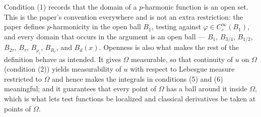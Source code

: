 \begin{definition}
Condition (1) records that the domain of a $p$-harmonic function is an open set.  This is the
paper's convention everywhere and is not an extra restriction: the paper defines
$p$-harmonicity in the open ball $B_1$, testing against $\varphi\in C^\infty_c(B_1)$, and every
domain that occurs in the argument is an open ball --- $B_1$, $B_{3/4}$, $B_{1/2}$, $B_{2\tau}$,
$B_\tau$, $B_{\rho_i}$, $B_{R_\ell}$, and $B_d(x)$.  Openness is also what makes the rest of
the definition behave as intended.  It gives $\Omega$ measurable, so that continuity of $u$ on
$\Omega$ (condition (2)) yields measurability of $u$ with respect to Lebesgue measure restricted
to $\Omega$ and hence makes the integrals in conditions (5) and (6) meaningful; and it
guarantees that every point of $\Omega$ has a ball around it inside $\Omega$, which is what
lets test functions be localized and classical derivatives be taken at points of $\Omega$.
\end{definition}
